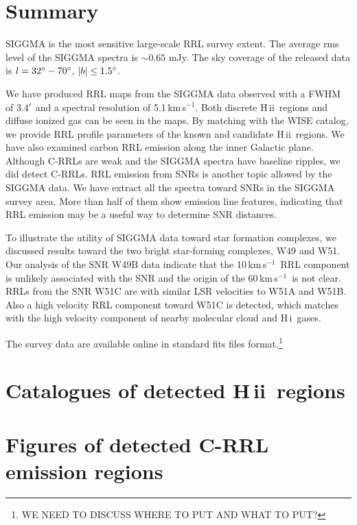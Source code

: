 \documentclass[manuscript]{aastex61}
\newcommand{\hii}{{\rm H\,}{{\sc ii}}}
\newcommand{\hi}{{\rm H\,}{{\sc i}}}
\newcommand{\kms}{\,km\,s$^{-1}$}
\begin{document}
\section{Summary} \label{sec_summ}
SIGGMA is the most sensitive large-scale RRL survey extent.
The average rms level of the SIGGMA spectra is $\sim 0.65$ mJy.
The sky coverage of the released data is $l=32\mbox{$^\circ$} - 70\mbox{$^\circ$}$, $|b|\le 1.5\mbox{$^\circ$}$.

We have produced RRL maps from the SIGGMA data observed with a FWHM of 3.4$\mbox{$^\prime$}$ and a spectral resolution of 5.1\kms. 
Both discrete \hii\ regions and diffuse ionized gas can be seen in the maps.
By matching with the WISE catalog, we provide RRL profile parameters of the known and candidate \hii\ regions.
We have also examined carbon RRL emission along the inner Galactic plane.
Although C-RRLs are weak and the SIGGMA spectra have baseline ripples, we did detect C-RRLs.
RRL emission from SNRs is another topic allowed by the SIGGMA data.
We have extract all the spectra toward SNRs in the SIGGMA survey area.
More than half of them show emission line features, indicating that RRL emission may be a useful way to determine SNR distances.

To illustrate the utility of SIGGMA data toward star formation complexes, we discussed results toward the two bright star-forming complexes, W49 and W51.
Our analysis of the SNR W49B data indicate that the 10\kms\ RRL component is unlikely associated with the SNR and the origin of the 60\kms\ is not clear.
RRLs from the SNR W51C are with similar LSR velocities to W51A and W51B.
Also a high velocity RRL component toward W51C is detected, which matches with the high velocity component of nearby molecular cloud and \hi\ gases.

The survey data are available online in standard fits files format.\footnote{WE NEED TO DISCUSS WHERE TO PUT AND WHAT TO PUT?}

\acknowledgments
\newpage
\appendix

\section{Catalogues of detected \hii\ regions}\label{appe:cata}


\newpage

\section{Figures of detected C-RRL emission regions}\label{appe:crrl}
\end{document}
